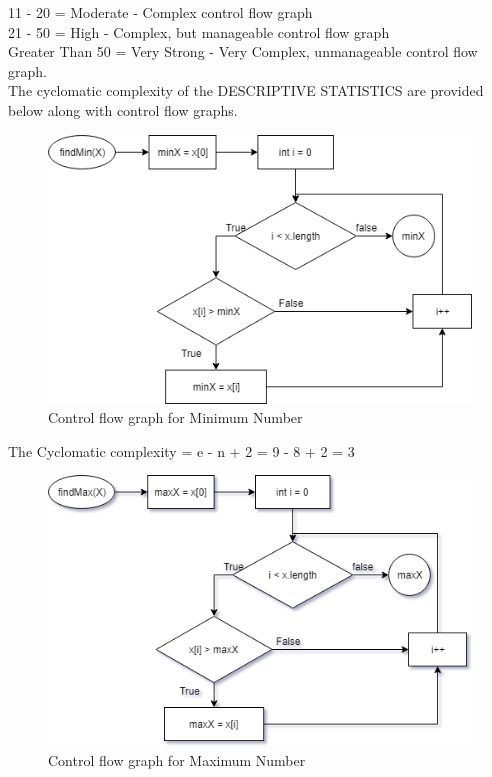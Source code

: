 \documentclass[a4paper, 11pt]{article}
\begin{document}
  11 - 20  = Moderate - Complex control flow graph  \\

  21 - 50  = High - Complex, but manageable control flow graph  \\

  Greater Than 50  = Very Strong - Very Complex, unmanageable control flow graph.\\
The cyclomatic complexity of the DESCRIPTIVE STATISTICS are provided below along with control flow graphs.\\
\footnotesize
\begin{figure}[H]
		\begin{center}
		\includegraphics[width=\columnwidth]{MIN.png}
		\caption{Control flow graph for Minimum Number}
		\label{fig:figure}
		\end{center}
	\end{figure}
The Cyclomatic complexity = e - n + 2 = 9 - 8 + 2 = 3\\
\begin{figure}[H]
		\begin{center}
		\includegraphics[width=\columnwidth]{Max_controlFlow.png}
		\caption{Control flow graph for Maximum Number}
		\label{fig:figure}
		\end{center}
	\end{figure}
\end{document}
